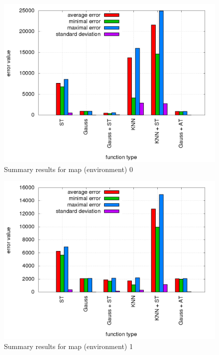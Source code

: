 \documentclass{acmbulletin}
\begin{document}
\begin{figure}[!htb]
\centering
\includegraphics[scale=.3]{../../results_q_learning/map_0/trials_average_results.png}
\caption{Summary results for map (environment) 0}
\label{img:experiment_average_0}
\end{figure}

\begin{figure}[!htb]
\centering
\includegraphics[scale=.3]{../../results_q_learning/map_1/trials_average_results.png}
\caption{Summary results for map (environment) 1}
\label{img:experiment_average_1}
\end{figure}
\end{document}

